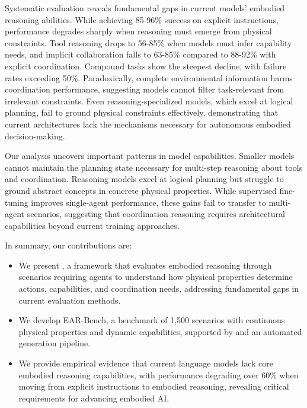 
Systematic evaluation reveals fundamental gaps in current models' embodied reasoning abilities. While achieving 85-96\% success on explicit instructions, performance degrades sharply when reasoning must emerge from physical constraints. Tool reasoning drops to 56-85\% when models must infer capability needs, and implicit collaboration falls to 63-85\% compared to 88-92\% with explicit coordination. Compound tasks show the steepest decline, with failure rates exceeding 50\%. Paradoxically, complete environmental information harms coordination performance, suggesting models cannot filter task-relevant from irrelevant constraints. Even reasoning-specialized models, which excel at logical planning, fail to ground physical constraints effectively, demonstrating that current architectures lack the mechanisms necessary for autonomous embodied decision-making.

Our analysis uncovers important patterns in model capabilities. Smaller models cannot maintain the planning state necessary for multi-step reasoning about tools and coordination. Reasoning models excel at logical planning but struggle to ground abstract concepts in concrete physical properties. While supervised fine-tuning improves single-agent performance, these gains fail to transfer to multi-agent scenarios, suggesting that coordination reasoning requires architectural capabilities beyond current training approaches.

In summary, our contributions are:

\begin{itemize}
\item We present \framework, a framework that evaluates embodied reasoning through scenarios requiring agents to understand how physical properties determine actions, capabilities, and coordination needs, addressing fundamental gaps in current evaluation methods.

\item We develop EAR-Bench, a benchmark of 1,500 scenarios with continuous physical properties and dynamic capabilities, supported by \simulator and an automated generation pipeline.

\item We provide empirical evidence that current language models lack core embodied reasoning capabilities, with performance degrading over 60\% when moving from explicit instructions to embodied reasoning, revealing critical requirements for advancing embodied AI.
\end{itemize}